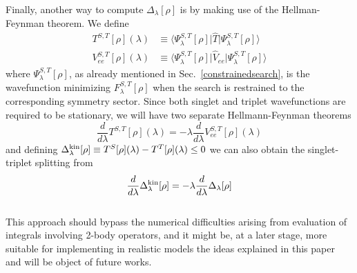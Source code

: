 \documentclass[aps,pra,twocolumn,superscriptaddress]{revtex4}
\begin{document}
Finally, another way to compute $\Delta_{\lambda}[\rho]$ is by making use of the Hellman-Feynman theorem. We define
\begin{equation}
\begin{aligned}
T^{S,T}[\rho](\lambda)&\equiv\langle\Psi_{\lambda}^{S,T}[\rho]\vert\hat{T}\vert\Psi_{\lambda}^{S,T}[\rho]\rangle\\V_{ee}^{S,T}[\rho](\lambda)&\equiv\langle\Psi_{\lambda}^{S,T}[\rho]\vert\hat{V}_{ee}\vert\Psi_{\lambda}^{S,T}[\rho]
\rangle
\end{aligned}
\end{equation}
where $\Psi^{S,T}_{\lambda}[\rho]$, as already mentioned in Sec.~\ref{constrainedsearch}, is the wavefunction minimizing $F^{S,T}_{\lambda}[\rho]$ when the search is restrained to the corresponding symmetry sector.
Since both singlet and triplet wavefunctions are required to be stationary, we will have two separate Hellmann-Feynman theorems
\begin{equation}
\frac{d}{d\lambda}T^{S,T}[\rho](\lambda)=-\lambda\frac{d}{d\lambda}V_{ee}^{S,T}[\rho](\lambda)
\end{equation}and defining $\Delta_{\lambda}^{\rm kin}[\rho]\equiv T^S[\rho](\lambda)-T^T[\rho](\lambda)\leq 0$ we can also obtain the singlet-triplet splitting from \begin{equation}
\frac{d}{d\lambda}\Delta_{\lambda}^{\rm kin}[\rho]=-\lambda\frac{d}{d\lambda}\Delta_{\lambda}[\rho]
\end{equation}\\This approach should bypass the numerical difficulties arising from evaluation of integrals involving 2-body operators, and it might be, at a later stage, more suitable for implementing in realistic models the ideas explained in this paper and will be object of future works.


\end{document}
